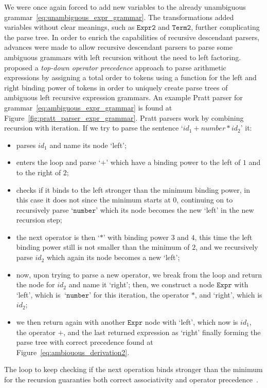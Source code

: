 \documentclass[
  oneside,
  english,
  coorientadorbanca,
  noabntexcite
]{ufsc-thesis-rn46-2019}
\newcommand{\code}[1]{\texttt{#1}}
\newcommand{\bnfvars}[1]{\code{#1}}
\newcommand{\bnfter}[1]{\ \bnfters{#1}}
\newcommand{\bnfters}[1]{\textrm{`}\code{#1}\textrm{'}}
\begin{document}
We were once again forced to add new variables to the already unambiguous grammar~\eqref{eq:unambiguous_expr_grammar}.
The transformations added variables without clear meanings, such as $\bnfvars{Expr2}$ and $\bnfvars{Term2}$, further complicating the parse tree.
In order to enrich the capabilities of recursive descendant parsers, advances were made to allow recursive descendant parsers to parse some ambiguous grammars with left recursion without the need to left factoring.
\textcite{pratt1973operatorprecedence} proposed a \textit{top-down operator precedence} approach to parse arithmetic expressions by assigning a total order to tokens using a function for the left and right binding power of tokens in order to uniquely create parse trees of ambiguous left recursive expression grammars.
An example Pratt parser for grammar~\eqref{eq:ambiguous_expr_grammar} is found at Figure~\ref{fig:pratt_parser_expr_grammar}.
Pratt parsers work by combining recursion with iteration.
If we try to parse the sentence `$id_1 + number * id_2$' it:
\begin{itemize}
  \item parses $id_1$ and name its node `left';
  \item enters the loop and parse $\bnfters{+}$ which have a binding power to the left of $1$ and to the right of $2$;
  \item checks if it binds to the left stronger than the minimum binding power, in this case it does not since the minimum starts at $0$, continuing on to recursively parse $\bnfters{number}$ which its node becomes the new `left' in the new recursion step;
  \item the next operator is then $\bnfters{*}$ with binding power $3$ and $4$, this time the left binding power still is not smaller than the minimum of $2$, and we recursively parse $id_2$ which again its node becomes a new `left';
  \item now, upon trying to parse a new operator, we break from the loop and return the node for $id_2$ and name it `right'; then, we construct a node $\bnfvars{Expr}$ with `left', which is $\bnfter{number}$ for this iteration, the operator $*$, and `right', which is $id_2$;
  \item we then return again with another $\bnfvars{Expr}$ node with `left', which now is $id_1$, the operator $+$, and the last returned expression as `right' finally forming the parse tree with correct precedence found at Figure~\ref{eq:ambiouous_derivation2}.
\end{itemize}
The loop to keep checking if the next operation binds stronger than the minimum for the recursion guaranties both correct associativity and operator precedence~\cite{pratt1973operatorprecedence}.
\end{document}
